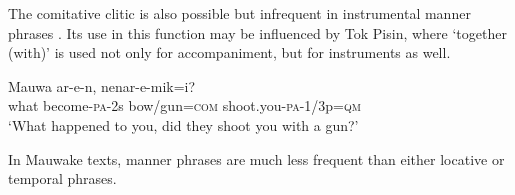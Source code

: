The comitative clitic is also possible but infrequent in instrumental manner phrases . Its use in this function may be influenced by Tok Pisin, where  `together (with)' is used not only for accompaniment, but for instruments as well.

\ea%
\label{ex:4:x890}
\gll Mauwa  ar-e-n,    nenar-e-mik=i? \\
 what  become-\textsc{pa}-2s  bow/gun=\textsc{com}  shoot.you-\textsc{pa}-1/3p=\textsc{qm}     \\
\glt`What happened to you, did they shoot you with a gun?'
\z

In Mauwake texts, manner phrases are much less frequent than either locative or temporal phrases.